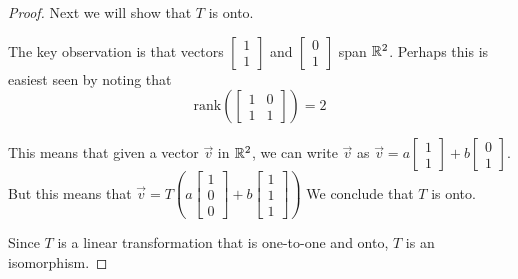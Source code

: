 \documentclass{ximera}
\begin{document}
\begin{example}
\begin{proof}
Next we will show that $T$ is onto.  

The key observation is that vectors $\begin{bmatrix}1\\1\end{bmatrix}$ and $\begin{bmatrix}0\\1\end{bmatrix}$ span $\mathbb{R}^2$.  Perhaps this is easiest seen by noting that $$\text{rank}\left(\begin{bmatrix}1&0\\1&1\end{bmatrix}\right)=2$$

This means that given a vector $\vec{v}$ in $\mathbb{R}^2$, we can write $\vec{v}$ as $\vec{v}=a\begin{bmatrix}1\\1\end{bmatrix}+b\begin{bmatrix}0\\1\end{bmatrix}$.  But this means that $\vec{v}=T\left(a\begin{bmatrix}1\\0\\0\end{bmatrix}+b\begin{bmatrix}1\\1\\1\end{bmatrix}\right)$  We conclude that $T$ is onto. 

Since $T$ is a linear transformation that  is one-to-one and onto, $T$ is an isomorphism.
\end{proof}
\end{example}
\end{document}
